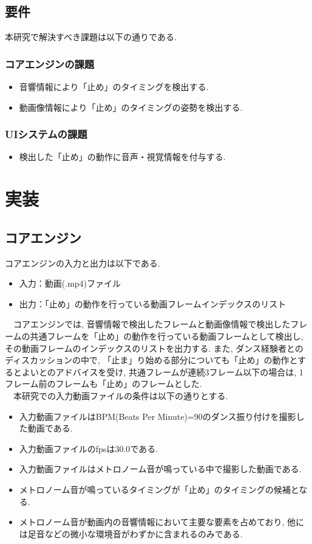 \documentclass[paper]{ieicej}
\begin{document}
\subsection{要件}
本研究で解決すべき課題は以下の通りである.\\
\subsubsection{コアエンジンの課題}
\begin{itemize}[nosep]
  \item 音響情報により「止め」のタイミングを検出する. 
  \item 動画像情報により「止め」のタイミングの姿勢を検出する. 
\end{itemize}
\subsubsection{UIシステムの課題}
\begin{itemize}
  \item 検出した「止め」の動作に音声・視覚情報を付与する.  
\end{itemize}
\section{実装}
\subsection{コアエンジン}
コアエンジンの入力と出力は以下である. 
\begin{itemize}[nosep]
  \item 入力：動画(.mp4)ファイル
  \item 出力：「止め」の動作を行っている動画フレームインデックスのリスト
\end{itemize}
　コアエンジンでは, 音響情報で検出したフレームと動画像情報で検出したフレームの共通フレームを「止め」の動作を行っている動画フレームとして検出し, その動画フレームのインデックスのリストを出力する. また, ダンス経験者とのディスカッションの中で, 「止ま」り始める部分についても「止め」の動作とするとよいとのアドバイスを受け, 共通フレームが連続3フレーム以下の場合は, 1フレーム前のフレームも「止め」のフレームとした. \\
　本研究での入力動画ファイルの条件は以下の通りとする. 
\begin{itemize}[nosep]
  \item 入力動画ファイルはBPM(Beats Per Minute)=90のダンス振り付けを撮影した動画である. 
  \item 入力動画ファイルのfpsは30.0である. 
  \item 入力動画ファイルはメトロノーム音が鳴っている中で撮影した動画である. 
  \item メトロノーム音が鳴っているタイミングが「止め」のタイミングの候補となる. 
  \item メトロノーム音が動画内の音響情報において主要な要素を占めており, 他には足音などの微小な環境音がわずかに含まれるのみである. 
\end{itemize}
\end{document}
